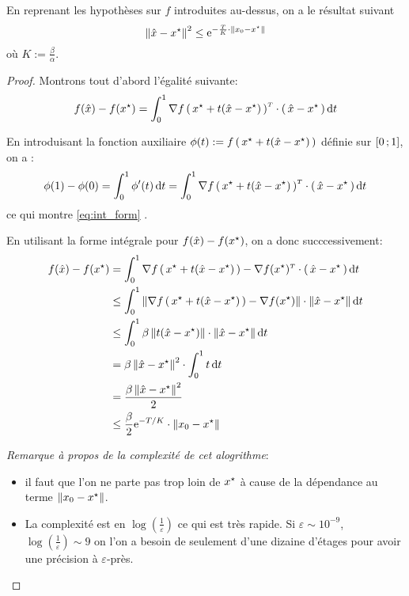    \begin{theorem}
En reprenant les hypothèses sur $f$ introduites au-dessus, on a le résultat suivant
\begin{equation}
\norme{\xhat - \xopt}^2 \leq \e^{-\frac{T}{K} \cdot \norme{x_0-\xopt}}
\end{equation}
où $K := \frac{\beta}{\alpha}$.
   \end{theorem}

\begin{proof}
Montrons tout d'abord l'égalité suivante:
\begin{equation}
  f(\xhat)- f(\xopt) = \int_{0}^{1} \transpose{\grad f\prt{\xopt+t(\xhat-\xopt)}}
   \cdot \prt{\xhat- \xopt} \dt
\end{equation}

En introduisant la fonction auxiliaire $\phi(t):= f\prt{\xopt+t(\xhat-\xopt)}$ définie sur $\mathopen{[}0\mathpunct{};1\mathclose{]}$, on a :
\begin{equation*}\label{eq:int_form}
  \phi(1)-\phi(0)= \int_0^1 \phi^{\prime}(t) \dt = \int_{0}^{1} \transpose{\grad f\prt{\xopt+t(\xhat-\xopt)}}
   \cdot \prt{\xhat- \xopt} \dt
\end{equation*}
ce qui montre \eqref{eq:int_form} .

En utilisant la forme intégrale pour $f(\xhat)- f(\xopt)$, on a donc succcessivement:
\begin{align*}
f(\xhat)- f(\xopt) &= \int_{0}^{1} \transpose{\grad f\prt{\xopt+t(\xhat-\xopt)}
- \grad f(\xopt)}
 \cdot \prt{\xhat- \xopt} \dt\\
 &\leq \int_{0}^{1} \norme{\grad f\prt{\xopt+t(\xhat-\xopt)} - \grad f(\xopt)}
  \cdot \norme{\xhat- \xopt} \dt\\
 &\leq \int_{0}^{1} \beta \norme{t(\xhat-\xopt)}
  \cdot \norme{\xhat- \xopt} \dt\\
 &= \beta \norme{\xhat- \xopt}^2 \cdot \int_{0}^{1} t  \dt\\
 &= \frac{ \beta \norme{\xhat- \xopt}^2}{2} \\
 &\leq \frac{\beta}{2} \e^{-T/K} \cdot \norme{x_0-\xopt}
\end{align*}

\textit{Remarque à propos de la complexité de cet alogrithme}:
\begin{itemize}
  \item il faut que l'on ne parte pas trop loin de $\xopt$ à cause de la dépendance au terme $\norme{x_0-\xopt}$.
  \item La complexité est en $\log(\frac{1}{\varepsilon})$ ce qui est très rapide. Si $\varepsilon \sim 10^{-9}$, $\log(\frac{1}{\varepsilon}) \sim 9$ on l'on a besoin de seulement
  d'une dizaine d'étages pour avoir une précision à $\varepsilon$-près.

\end{itemize}
\end{proof}

